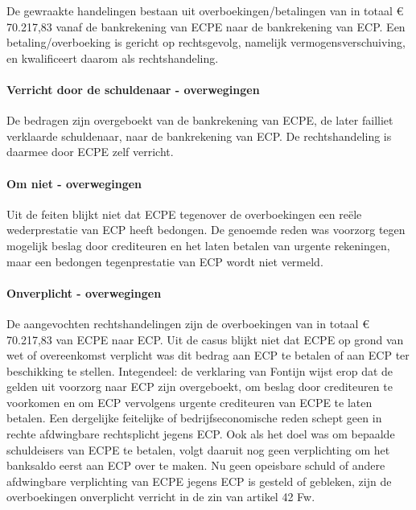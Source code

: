 \documentclass[
  dutch,
  a4paper,
]{article}
\begin{document}
De gewraakte handelingen bestaan uit overboekingen/betalingen van in totaal € 70.217,83 vanaf de bankrekening van ECPE naar de bankrekening van ECP. Een betaling/overboeking is gericht op rechtsgevolg, namelijk vermogensverschuiving, en kwalificeert daarom als rechtshandeling.

\paragraph{Verricht door de schuldenaar - overwegingen}\label{verricht-door-de-schuldenaar---overwegingen-46}

De bedragen zijn overgeboekt van de bankrekening van ECPE, de later failliet verklaarde schuldenaar, naar de bankrekening van ECP. De rechtshandeling is daarmee door ECPE zelf verricht.

\paragraph{Om niet - overwegingen}\label{om-niet---overwegingen-46}

Uit de feiten blijkt niet dat ECPE tegenover de overboekingen een reële wederprestatie van ECP heeft bedongen. De genoemde reden was voorzorg tegen mogelijk beslag door crediteuren en het laten betalen van urgente rekeningen, maar een bedongen tegenprestatie van ECP wordt niet vermeld.

\paragraph{Onverplicht - overwegingen}\label{onverplicht---overwegingen-46}

De aangevochten rechtshandelingen zijn de overboekingen van in totaal € 70.217,83 van ECPE naar ECP. Uit de casus blijkt niet dat ECPE op grond van wet of overeenkomst verplicht was dit bedrag aan ECP te betalen of aan ECP ter beschikking te stellen. Integendeel: de verklaring van Fontijn wijst erop dat de gelden uit voorzorg naar ECP zijn overgeboekt, om beslag door crediteuren te voorkomen en om ECP vervolgens urgente crediteuren van ECPE te laten betalen. Een dergelijke feitelijke of bedrijfseconomische reden schept geen in rechte afdwingbare rechtsplicht jegens ECP. Ook als het doel was om bepaalde schuldeisers van ECPE te betalen, volgt daaruit nog geen verplichting om het banksaldo eerst aan ECP over te maken. Nu geen opeisbare schuld of andere afdwingbare verplichting van ECPE jegens ECP is gesteld of gebleken, zijn de overboekingen onverplicht verricht in de zin van artikel 42 Fw.
\end{document}
